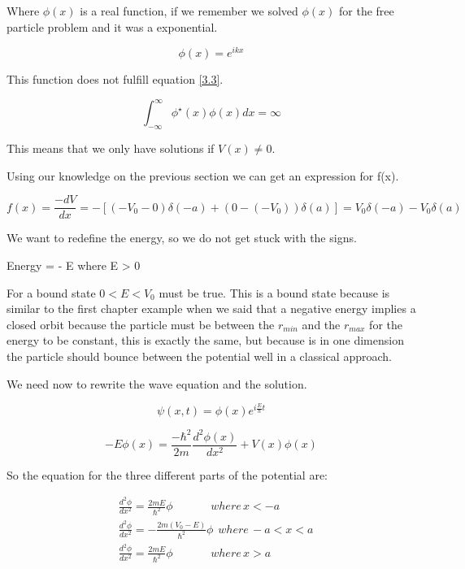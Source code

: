 Where $\phi(x)$ is a real function, if we remember we solved $\phi(x)$ for the free particle problem and it was a exponential.

\begin{equation}
    \label{3.14}
    \phi(x) = e^{ikx}
\end{equation}

This function does not fulfill equation \ref{3.3}.

\begin{equation}
    \label{3.15}
    \int_{-\infty}^{\infty} \phi^{\star}(x)\phi(x) dx = \infty
\end{equation}

This means that we only have solutions if $V(x) \neq 0$. 

Using our knowledge on the previous section we can get an expression for f(x).

\begin{equation}
    \label{3.16}
    f(x) = \frac{-dV}{dx} = - [ (-V_0-0)\delta(-a) + (0-(-V_0))\delta(a) ] = V_0\delta(-a)-V_0\delta(a)
\end{equation}

We want to redefine the energy, so we do not get stuck with the signs.

Energy = - E where E > 0

For a bound state $0<E<V_0$ must be true. This is a bound state because is similar to the first chapter example when we said that a negative energy implies a closed orbit because the particle must be between the $r_{min}$ and the $r_{max}$ for the energy to be constant, this is exactly the same, but because is in one dimension the particle should bounce between the potential well in a classical approach.

We need now to rewrite the wave equation and the solution.

\begin{equation}
    \psi(x,t) = \phi(x)e^{i\frac{E}{\hbar}t}
\end{equation}

\begin{equation}
    - E\phi(x) = \frac{-\hbar^2}{2m} \frac{d^2\phi(x)}{dx^2}+V(x)\phi(x)
\end{equation}

So the equation for the three different parts of the potential are:

\begin{equation}
    \label{3.19}
    \begin{split}
        & \frac{d^2\phi}{dx^2} = \frac{2mE}{\hbar^2}\phi \hspace{40pt} where \hspace{2pt} x < -a
        \\ 
        & \frac{d^2\phi}{dx^2} = - \frac{2m(V_0-E)}{\hbar^2}\phi \hspace{5pt} where \hspace{2pt} -a < x < a
        \\
        & \frac{d^2\phi}{dx^2} = \frac{2mE}{\hbar^2}\phi \hspace{40pt} where \hspace{2pt} x > a
    \end{split}
\end{equation}


